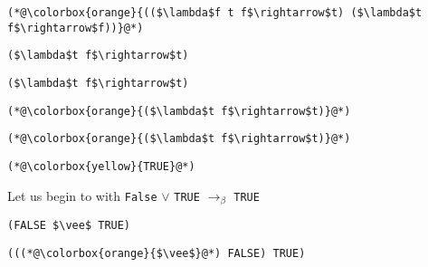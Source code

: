 \documentclass{beamer}
\begin{document}
\begin{frame}[fragile]{\CurrentSection}
\lstset{basicstyle=\ttfamily\small}\lstset{numbers=none}\lstset{language=ML}\begin{lstlisting}
(*@\colorbox{orange}{(($\lambda$f t f$\rightarrow$t) ($\lambda$t f$\rightarrow$f))}@*)
\end{lstlisting}
\pause\lstset{language=ML}\begin{lstlisting}
($\lambda$t f$\rightarrow$t)
\end{lstlisting}

\end{frame}

\begin{frame}[fragile]{\CurrentSection}
\lstset{basicstyle=\ttfamily\small}\lstset{numbers=none}\lstset{language=ML}\begin{lstlisting}
($\lambda$t f$\rightarrow$t)
\end{lstlisting}
\pause\lstset{language=ML}\begin{lstlisting}
(*@\colorbox{orange}{($\lambda$t f$\rightarrow$t)}@*)
\end{lstlisting}

\end{frame}

\begin{frame}[fragile]{\CurrentSection}
\lstset{basicstyle=\ttfamily\small}\lstset{numbers=none}\lstset{language=ML}\begin{lstlisting}
(*@\colorbox{orange}{($\lambda$t f$\rightarrow$t)}@*)
\end{lstlisting}
\pause\lstset{language=ML}\begin{lstlisting}
(*@\colorbox{yellow}{TRUE}@*)
\end{lstlisting}

\end{frame}

\begin{frame}[fragile]{\CurrentSection}
\begin{block}{\CurrentSubSection}
Let us begin to with \texttt{False} $\vee$ \texttt{TRUE} $\rightarrow_\beta$ \texttt{TRUE}
\end{block}


\end{frame}

\begin{frame}[fragile]{\CurrentSection}
\lstset{basicstyle=\ttfamily\small}\lstset{numbers=none}\lstset{language=ML}\begin{lstlisting}
(FALSE $\vee$ TRUE)
\end{lstlisting}
\pause\lstset{language=ML}\begin{lstlisting}
(((*@\colorbox{orange}{$\vee$}@*) FALSE) TRUE)
\end{lstlisting}

\end{frame}
\end{document}
